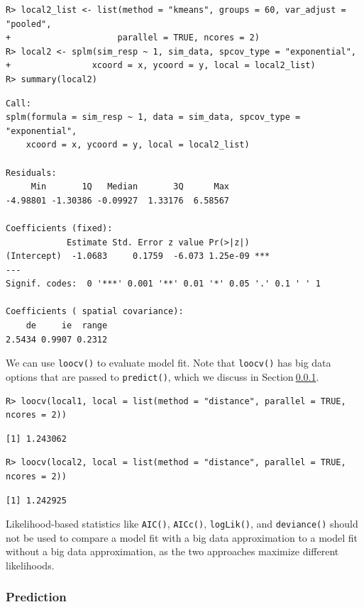 \documentclass{article}
\begin{document}
\begin{verbatim}
R> local2_list <- list(method = "kmeans", groups = 60, var_adjust = "pooled",
+                     parallel = TRUE, ncores = 2)
R> local2 <- splm(sim_resp ~ 1, sim_data, spcov_type = "exponential", 
+                xcoord = x, ycoord = y, local = local2_list)
R> summary(local2)
\end{verbatim}

\begin{verbatim}
Call:
splm(formula = sim_resp ~ 1, data = sim_data, spcov_type = "exponential", 
    xcoord = x, ycoord = y, local = local2_list)

Residuals:
     Min       1Q   Median       3Q      Max 
-4.98801 -1.30386 -0.09927  1.33176  6.58567 

Coefficients (fixed):
            Estimate Std. Error z value Pr(>|z|)    
(Intercept)  -1.0683     0.1759  -6.073 1.25e-09 ***
---
Signif. codes:  0 '***' 0.001 '**' 0.01 '*' 0.05 '.' 0.1 ' ' 1

Coefficients ( spatial covariance):
    de     ie  range 
2.5434 0.9907 0.2312 
\end{verbatim}

We can use \texttt{loocv()} to evaluate model fit. Note that
\texttt{loocv()} has big data options that are passed to
\texttt{predict()}, which we discuss in Section\(~\)\ref{sec:predict}.

\begin{verbatim}
R> loocv(local1, local = list(method = "distance", parallel = TRUE, ncores = 2))
\end{verbatim}

\begin{verbatim}
[1] 1.243062
\end{verbatim}

\begin{verbatim}
R> loocv(local2, local = list(method = "distance", parallel = TRUE, ncores = 2))
\end{verbatim}

\begin{verbatim}
[1] 1.242925
\end{verbatim}

Likelihood-based statistics like \texttt{AIC()}, \texttt{AICc()},
\texttt{logLik()}, and \texttt{deviance()} should not be used to compare
a model fit with a big data approximation to a model fit without a big
data approximation, as the two approaches maximize different
likelihoods.

\hypertarget{sec:predict}{%
\subsubsection{Prediction}\label{sec:predict}}
\end{document}
